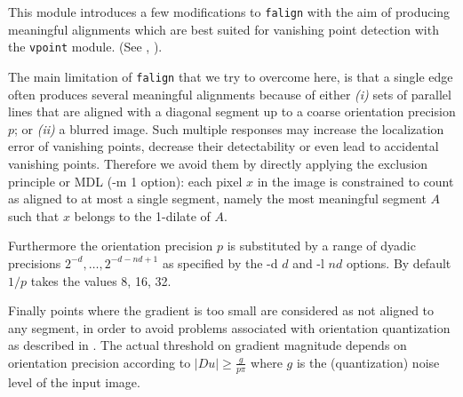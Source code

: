 This module introduces a few modifications to \verb+falign+
with the aim of producing meaningful alignments which are best suited for
vanishing point detection with the \verb+vpoint+ module. 
(See \cite{almansa.desolneux.vamech:vanish}, \cite{almansa:phd}).

The main limitation of \verb+falign+ that we try to overcome here,
is that a single edge often produces several meaningful alignments
because of either \emph{(i)} sets of parallel lines that are aligned with a diagonal segment up to a coarse orientation precision $p$; or \emph{(ii)} a blurred image.
Such multiple responses may increase the localization error of vanishing points, decrease their detectability or even lead to accidental vanishing points.
Therefore we avoid them by directly applying the exclusion principle or MDL 
(-m 1 option): each pixel $x$ in the image is constrained to count as aligned to at most a single segment, namely the most meaningful segment $A$ such that $x$ belongs to the 1-dilate of $A$.

Furthermore the orientation precision $p$ is substituted by a range of dyadic precisions $2^{-d},\dots,2^{-d-nd+1}$ as specified by the -d $d$ and -l $nd$ options. By default $1/p$ takes the values 8, 16, 32.

Finally points where the gradient is too small are considered as not aligned to any segment, in order to avoid problems associated with orientation quantization as described in \cite{desolneux.ladjal.ea:dequant}. The actual threshold on gradient magnitude depends on orientation precision according to
$        |Du| \geq \frac{g}{p\pi} $
where $g$ is the (quantization) noise level of the input image.


